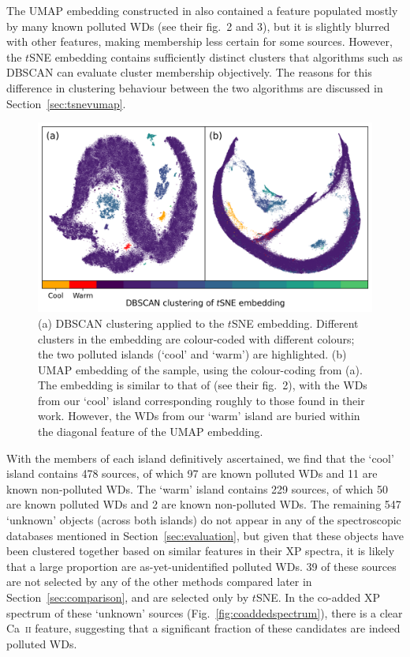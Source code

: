 \documentclass[fleqn,usenatbib]{rasti}
\begin{document}
The UMAP embedding constructed in \citet{kao24} also contained a feature populated mostly by many known polluted WDs (see their fig.~2 and 3), but it is slightly blurred with other features, making membership less certain for some sources.
However, the $t$SNE embedding contains sufficiently distinct clusters that algorithms such as DBSCAN can evaluate cluster membership objectively.
The reasons for this difference in clustering behaviour between the two algorithms are discussed in Section~\ref{sec:tsnevumap}.

\begin{figure}
\centering
\includegraphics[width=\textwidth]{figures/fig2_tsneclustering.png}
\caption{
    (a) DBSCAN clustering applied to the $t$SNE embedding.
    Different clusters in the embedding are colour-coded with different colours; the two polluted islands (`cool' and `warm') are highlighted.
    (b) UMAP embedding of the sample, using the colour-coding from (a).
    The embedding is similar to that of \citet{kao24} (see their fig.~2), with the WDs from our `cool' island corresponding roughly to those found in their work.
    However, the WDs from our `warm' island are buried within the diagonal feature of the UMAP embedding.
}
\label{fig:tsneclustering}
\end{figure}

With the members of each island definitively ascertained, we find that the `cool' island contains 478 sources, of which 97 are known polluted WDs and 11 are known non-polluted WDs.
The `warm' island contains 229 sources, of which 50 are known polluted WDs and 2 are known non-polluted WDs.
The remaining 547 `unknown' objects (across both islands) do not appear in any of the spectroscopic databases mentioned in Section~\ref{sec:evaluation}, but given that these objects have been clustered together based on similar features in their XP spectra, it is likely that a large proportion are as-yet-unidentified polluted WDs.
39 of these sources are not selected by any of the other methods compared later in Section~\ref{sec:comparison}, and are selected only by $t$SNE.
In the co-added XP spectrum of these `unknown' sources (Fig.~\ref{fig:coaddedspectrum}), there is a clear Ca~\textsc{ii} feature, suggesting that a significant fraction of these candidates are indeed polluted WDs.
\end{document}
